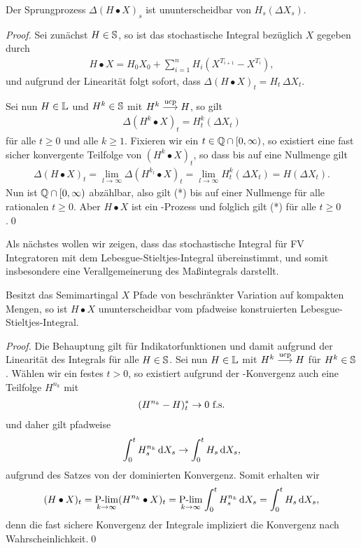 \begin{theorem}
\label{prop:2.11}
Der Sprungprozess $\Delta(H\bullet X)_s$ ist ununterscheidbar von $H_s(\Delta
X_s)$.\fish
\end{theorem}
\begin{proof}
Sei zunächst $H\in \S$, so ist das stochastische Integral bezüglich $X$ gegeben
durch
\begin{align*}
H\bullet X = H_0 X_0 + \sum_{i=1}^n H_i (X^{T_{i+1}} - X^{T_i}),
\end{align*}
und aufgrund der Linearität folgt sofort, dass $\Delta (H\bullet X)_t = H_t\,
\Delta X_t$.

Sei nun $H\in \L$ und $H^k\in \S$ mit $H^k\ucpto H$, so gilt
\begin{align*}
\Delta(H^k\bullet X)_t = H_t^k(\Delta X_t)
\end{align*}
für alle $t\ge 0$ und alle $k\ge 1$. Fixieren wir ein $t\in \Q\cap[0,\infty)$,
so existiert eine fast sicher konvergente Teilfolge von $(H^k\bullet X)_t$, so
dass bis auf eine Nullmenge gilt
\begin{align*}
\Delta(H\bullet X)_t = \lim\limits_{l\to \infty} \Delta(H^{k_l}\bullet
X)_t = \lim\limits_{l\to \infty} H_t^k(\Delta X_t) = H (\Delta X_t).\tag{*}
\end{align*}
Nun ist $\Q\cap[0,\infty)$ abzählbar, also gilt (*) bis auf einer Nullmenge für
alle rationalen $t\ge 0$. Aber $H\bullet X$ ist ein \cadlag-Prozess und
folglich gilt (*) \fs für alle $t\ge 0$.\qed
\end{proof}

Als nächstes wollen wir zeigen, dass das stochastische Integral für
FV Integratoren mit dem Lebesgue-Stieltjes-Integral übereinstimmt, und somit
insbesondere eine Verallgemeinerung des Maßintegrals darstellt.

\begin{theorem}
\label{prop:2.12}
Besitzt das Semimartingal $X$ Pfade von beschränkter Variation auf kompakten
Mengen, so ist $H\bullet X$ ununterscheidbar vom pfadweise konstruierten
Lebesgue-Stieltjes-Integral.
\end{theorem}
\begin{proof}
Die Behauptung gilt für Indikatorfunktionen und damit aufgrund der
Linearität des Integrals für alle $H\in \S$. Sei nun $H\in \L$ mit $H^k\ucpto H$
für $H^k\in \S$. Wählen wir ein festes $t > 0$, so existiert aufgrund der
\ucp-Konvergenz auch eine Teilfolge $H^{n_k}$ mit
\begin{align*}
(H^{n_k}-H)_t^* \to 0\ \fs
\end{align*}
und daher gilt pfadweise
\begin{align*}
\int_0^t H_s^{n_k}\dX_s \to  \int_0^t H_s\dX_s,
\end{align*}
aufgrund des Satzes von der dominierten Konvergenz. Somit erhalten wir
\begin{align*}
(H\bullet X)_t = \Plim_{k\to \infty} (H^{n_k}\bullet X)_t = 
\Plim_{k\to \infty} \int_0^t H_s^{n_k}\dX_s =
\int_0^t H_s\dX_s,
\end{align*}
denn die fast sichere Konvergenz der Integrale impliziert die Konvergenz nach
Wahrscheinlichkeit.\qed
\end{proof}

